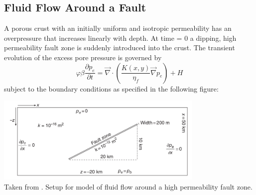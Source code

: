 \subsection*{Fluid Flow Around a Fault}

A porous crust with an initially uniform and isotropic permeability has an
overpressure that increases linearly with depth. At time = 0 a dipping, high permeability fault zone is
suddenly introduced into the crust.
The transient evolution of the excess pore pressure is governed by
\begin{equation}
\varphi \beta  \frac{\partial p_e}{\partial t}
=
\vec\nabla \cdot \left( \frac{K(x,y)}{\eta_f} \vec\nabla p_e  \right) + H
\end{equation}
subject to the boundary conditions as specified in the following figure:
\begin{center}
\includegraphics[width=10cm]{python_codes/fieldstone_128/images/simpson1}\\
{\captionfont Taken from \cite{simp17}. Setup for model of fluid flow around a high permeability fault zone.}
\end{center}


